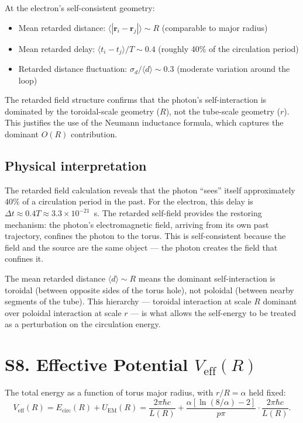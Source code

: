 \documentclass[11pt,a4paper]{article}
\begin{document}
At the electron's self-consistent geometry:
\begin{itemize}
  \item Mean retarded distance: $\langle |\mathbf{r}_i - \mathbf{r}_j| \rangle \sim R$ (comparable to major radius)
  \item Mean retarded delay: $\langle t_i - t_j \rangle / T \sim 0.4$ (roughly 40\% of the circulation period)
  \item Retarded distance fluctuation: $\sigma_d / \langle d \rangle \sim 0.3$ (moderate variation around the loop)
\end{itemize}

The retarded field structure confirms that the photon's self-interaction is dominated by the toroidal-scale geometry ($R$), not the tube-scale geometry ($r$). This justifies the use of the Neumann inductance formula, which captures the dominant $O(R)$ contribution.

\subsection{Physical interpretation}

The retarded field calculation reveals that the photon ``sees'' itself approximately 40\% of a circulation period in the past. For the electron, this delay is $\Delta t \approx 0.4T \approx 3.3 \times 10^{-21}$~s. The retarded self-field provides the restoring mechanism: the photon's electromagnetic field, arriving from its own past trajectory, confines the photon to the torus. This is self-consistent because the field and the source are the same object --- the photon creates the field that confines it.

The mean retarded distance $\langle d \rangle \sim R$ means the dominant self-interaction is toroidal (between opposite sides of the torus hole), not poloidal (between nearby segments of the tube). This hierarchy --- toroidal interaction at scale $R$ dominant over poloidal interaction at scale $r$ --- is what allows the self-energy to be treated as a perturbation on the circulation energy.

\section{S8. Effective Potential \texorpdfstring{$V_{\text{eff}}(R)$}{V\_eff(R)}}
\label{sec:S8}

The total energy as a function of torus major radius, with $r/R = \alpha$ held fixed:
\begin{equation}
  V_{\text{eff}}(R) = E_{\text{circ}}(R) + U_{\text{EM}}(R) = \frac{2\pi\hbar c}{L(R)} + \frac{\alpha[\ln(8/\alpha) - 2]}{p\pi}\cdot\frac{2\pi\hbar c}{L(R)}.
\end{equation}
\end{document}

